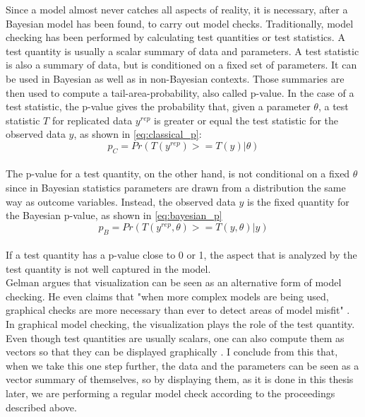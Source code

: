 \documentclass{article}
\begin{document}
Since a model almost never catches all aspects of reality, it is necessary, after a Bayesian model has been found, to carry out model checks. Traditionally, model checking has been performed by calculating test quantities or test statistics. A test quantity is usually a scalar summary of data and parameters. A test statistic is also a summary of data, but is conditioned on a fixed set of parameters. It can be used in Bayesian as well as in non-Bayesian contexts. Those summaries are then used to compute a tail-area-probability, also called p-value. In the case of a test statistic, the p-value gives the probability that, given a parameter $\theta$, a test statistic $T$ for replicated data $y^{rep}$ is greater or equal the test statistic  for the observed data $y$, as shown in \autoref{eq:classical_p}:
\begin{equation}
p_C = Pr(T(y^{rep}) >= T(y) | \theta)
\label{eq:classical_p}
\end{equation}
\cite{1439840954}\\
The p-value for a test quantity, on the other hand, is not conditional on a fixed $\theta$ since in Bayesian statistics parameters are drawn from a distribution the same way as outcome variables. Instead, the observed data $y$ is the fixed quantity for the Bayesian p-value, as shown in \autoref{eq:bayesian_p}
\begin{equation}
p_B = Pr(T(y^{rep},\theta) >= T(y,\theta) | y)
\label{eq:bayesian_p}
\end{equation}
\cite{1439840954}\\
If a test quantity has a p-value close to 0 or 1, the aspect that is analyzed by the test quantity is not well captured in the model.\\
Gelman \cite{gelman2004exploratory} argues that visualization can be seen as an alternative form of model checking. He even claims that "when more complex models are being used, graphical checks are more necessary than ever to detect areas of model misfit" \cite{gelman2004exploratory}. In graphical model checking, the visualization plays the role of the test quantity. Even though test quantities are usually scalars, one can also compute them as vectors so that they can be displayed graphically \cite{gelman2004exploratory}. I conclude from this that, when we take this one step further, the data and the parameters can be seen as a vector summary of themselves, so by displaying them, as it is done in this thesis later, we are performing a regular model check according to the proceedings described above.
\end{document}
